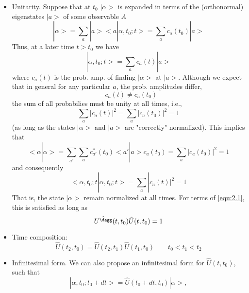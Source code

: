 \begin{itemize}
  \item Unitarity. Suppose that at $t_0$ $|\alpha>$ is
    expanded in terms of the (orthonormal) eigenstates $|a>$
    of some observable $A$
    \begin{equation}
      |\alpha> = \sum_a |a><a|\alpha,t_0;t> = \sum_a
      c_a(t_0)|a>
      \label{equ:2.2}
    \end{equation}
    Thus, at a later time $t > t_0$ we have
    \begin{equation}
      |\alpha,t_0;t> = \sum_a c_a(t) |a>
      \label{equ:2.3}
    \end{equation}
    where $c_a(t)$ is the prob. amp. of finding $|\alpha>$
    at $|a>$.
    Although we expect that in general for any particular
    $a$, the prob. amplitudes differ,
    $$-
      c_a(t) \neq c_a(t_0)
    $$
    the sum of all probabilies must be unity at all times,
    i.e.,
    \begin{equation}
      \sum_a |c_a(t)|^2 = \sum_a |c_a(t_0)|^2 = 1
      \label{equ:2.4}
    \end{equation}
    (as long as the states $|\alpha>$ and $|a>$ are
    "correctly" normalized).
    This implies that
    \begin{equation}
      <\alpha|\alpha> = \sum_{a'} \sum_a c_{a'}^*(t_0)
      <a'|a>  c_a(t_0) = \sum_a |c_a(t_0)|^2 = 1
      \label{equ:2.5}
    \end{equation}
    and consequently
    \begin{equation}
      <\alpha,t_0;t|\alpha,t_0;t> = \sum_a |c_a(t)|^2 = 1
      \label{equ:2.6}
    \end{equation}
    That is, the state $|\alpha>$ remain normalized at all
    times. For terms of \ref{equ:2.1}, this is satisfied as
    long as
    \begin{equation}
      \hat{U^\dagg}(t, t_0) \hat{U}(t,t_0) = 1
      \label{equ:2.7}
    \end{equation}
  \item Time composition:
    \begin{equation}
      \hat{U}(t_2,t_0) = \hat{U}(t_2,t_1) \hat{U}(t_1,t_0)
      \qquad t_0 < t_1 < t_2
      \label{equ:2.8}
    \end{equation}
  \item Infinitesimal form. We can also propose an
    infinitesimal form for $\hat{U}(t,t_0)$, such that
    \begin{equation}
      |\alpha,t_0;t_0 + dt> = \hat{U}(t_0+dt,t_0) |\alpha>,

\end{equation}
\end{itemize}
